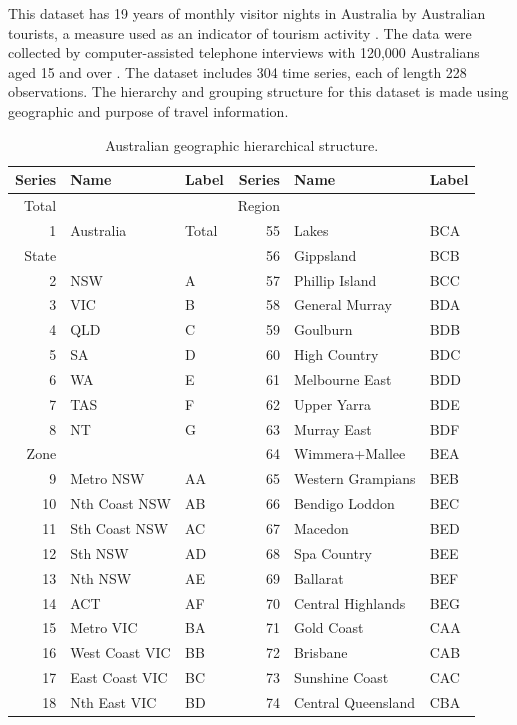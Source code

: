 \documentclass[11pt,a4paper,]{article}
\begin{document}
This dataset has 19 years of monthly visitor nights in Australia by Australian tourists, a measure used as an indicator of tourism activity \autocite{mint2018}. The data were collected by computer-assisted telephone interviews with 120,000 Australians aged 15 and over \autocite{researchAustralia2005}. The dataset includes 304 time series, each of length 228 observations. The hierarchy and grouping structure for this dataset is made using geographic and purpose of travel information.

\begingroup\fontsize{9}{11}\selectfont

\begin{longtable}[t]{rllrll}
\caption{\label{tab:Australiageographicaldivision}Australian geographic hierarchical structure.}\\
\toprule
Series & Name & Label & Series & Name & Label\\
\midrule
Total &  &  & Region &  & \\
1 & Australia & Total & 55 & Lakes & BCA\\
State &  &  & 56 & Gippsland & BCB\\
2 & NSW & A & 57 & Phillip Island & BCC\\
3 & VIC & B & 58 & General Murray & BDA\\
4 & QLD & C & 59 & Goulburn & BDB\\
5 & SA & D & 60 & High Country & BDC\\
6 & WA & E & 61 & Melbourne East & BDD\\
7 & TAS & F & 62 & Upper Yarra & BDE\\
8 & NT & G & 63 & Murray East & BDF\\
Zone &  &  & 64 & Wimmera+Mallee & BEA\\
9 & Metro NSW & AA & 65 & Western Grampians & BEB\\
10 & Nth Coast NSW & AB & 66 & Bendigo Loddon & BEC\\
11 & Sth Coast NSW & AC & 67 & Macedon & BED\\
12 & Sth NSW & AD & 68 & Spa Country & BEE\\
13 & Nth NSW & AE & 69 & Ballarat & BEF\\
14 & ACT & AF & 70 & Central Highlands & BEG\\
15 & Metro VIC & BA & 71 & Gold Coast & CAA\\
16 & West Coast VIC & BB & 72 & Brisbane & CAB\\
17 & East Coast VIC & BC & 73 & Sunshine Coast & CAC\\
18 & Nth East VIC & BD & 74 & Central Queensland & CBA\\

\end{longtable}
\end{document}
